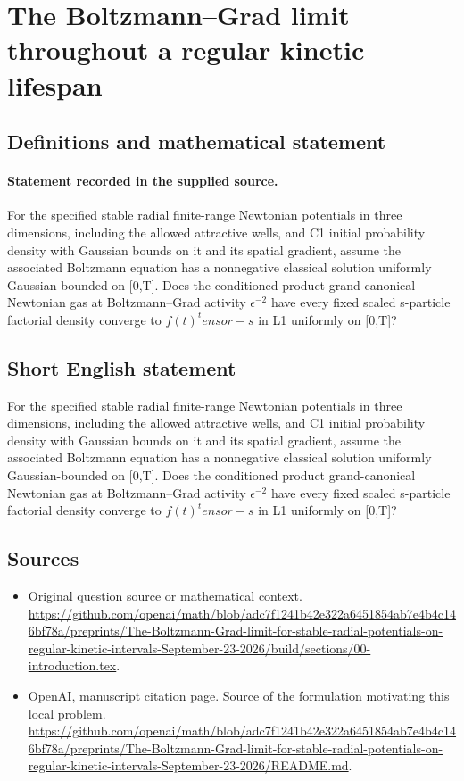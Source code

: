 \documentclass[11pt]{article}
\begin{document}
\section*{The Boltzmann–Grad limit throughout a regular kinetic lifespan}\label{30007340}
\subsection{Definitions and mathematical statement}
\paragraph{Statement recorded in the supplied source.}
For the specified stable radial finite-range Newtonian potentials in three dimensions, including the allowed attractive wells, and C1 initial probability density with Gaussian bounds on it and its spatial gradient, assume the associated Boltzmann equation has a nonnegative classical solution uniformly Gaussian-bounded on [0,T]. Does the conditioned product grand-canonical Newtonian gas at Boltzmann–Grad activity $\epsilon ^{-2}$ have every fixed scaled s-particle factorial density converge to $f(t)^tensor-s$ in L1 uniformly on [0,T]?
\subsection{Short English statement}
For the specified stable radial finite-range Newtonian potentials in three dimensions, including the allowed attractive wells, and C1 initial probability density with Gaussian bounds on it and its spatial gradient, assume the associated Boltzmann equation has a nonnegative classical solution uniformly Gaussian-bounded on [0,T]. Does the conditioned product grand-canonical Newtonian gas at Boltzmann–Grad activity $\epsilon ^{-2}$ have every fixed scaled s-particle factorial density converge to $f(t)^tensor-s$ in L1 uniformly on [0,T]?
\subsection{Sources}
\begin{itemize}
\item[S1] Original question source or mathematical context.
\url{https://github.com/openai/math/blob/adc7f1241b42e322a6451854ab7e4b4c146bf78a/preprints/The-Boltzmann-Grad-limit-for-stable-radial-potentials-on-regular-kinetic-intervals-September-23-2026/build/sections/00-introduction.tex}.
\item[S2] OpenAI, manuscript citation page. Source of the formulation motivating this local problem.
\url{https://github.com/openai/math/blob/adc7f1241b42e322a6451854ab7e4b4c146bf78a/preprints/The-Boltzmann-Grad-limit-for-stable-radial-potentials-on-regular-kinetic-intervals-September-23-2026/README.md}.
\end{itemize}
\end{document}

